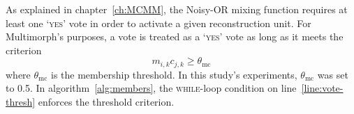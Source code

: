 As explained in chapter~\ref{ch:MCMM}, the 
 Noisy-OR mixing function requires at least one `\textsc{yes}' vote 
 in order to activate a given reconstruction unit.
 For Multimorph's 
 purposes, a vote is treated as a `\textsc{yes}' vote as long as it meets 
 the criterion 
 \begin{equation}\label{eq:vote-criterion}
 m_{i,k}c_{j,k} \geq \theta_{\text{mc}}
 \end{equation}
 where $\theta_{\text{mc}}$ is the membership threshold. %
 In this study's experiments, $\theta_{\text{mc}}$ 
 was 
 set to 0.5.   %
 In algorithm~\ref{alg:members}, the \textsc{while}-loop condition on line~\ref{line:vote-thresh} enforces the threshold criterion. 
 
